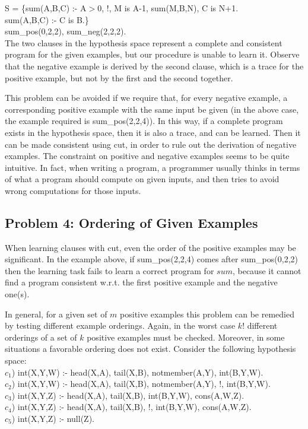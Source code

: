 \noindent
S = \{sum(A,B,C) :- A$>$0, !, M is A-1, sum(M,B,N), C is N+1.\\
\hspace*{0.4in}sum(A,B,C) :- C is B.\}\\
sum\_pos(0,2,2), sum\_neg(2,2,2).\\
 
\noindent
The two clauses in the hypothesis space
represent a complete and consistent program for
the given examples, but our procedure
is unable to learn it. Observe that the
negative example is derived by the second clause,
which is a trace for the positive example, but not by
the first and the second together. 
 
This problem can be avoided if we require
that, for every negative example,
a corresponding positive example with the same input be given
(in the above case, the example required is sum\_pos(2,2,4)).
In this way, if a complete program exists in the hypothesis space, 
then it is also a trace, and can be learned. Then it
can be made consistent using cut,  in order to rule out the derivation
of negative examples. 
The constraint on positive and negative examples seems to be quite 
intuitive. In fact,  when writing a program,
a programmer usually thinks in terms of what a program
should compute on given inputs, 
and then tries to avoid wrong computations for those inputs. 
 
\subsection{Problem 4: Ordering of Given Examples} 
When learning clauses with cut, even 
the order of the positive examples may be significant. In the
example above, if sum\_pos(2,2,4) comes after sum\_pos(0,2,2) then
the learning task
fails to learn a correct program for $sum$, because it cannot find a
program consistent w.r.t. the first positive example and the negative one(s).
 
In general, for a given set of $m$ positive examples
this problem can be remedied by testing different example orderings.
Again, in the worst case $k$! different orderings of a set 
of $k$ positive examples must be checked. Moreover, 
in some situations a favorable ordering does not exist. Consider
the following hypothesis space:\\
 
\noindent
$c_1$) int(X,Y,W) :- head(X,A), tail(X,B), notmember(A,Y), int(B,Y,W).\\
$c_2$) int(X,Y,W) :- head(X,A), tail(X,B), notmember(A,Y), !, int(B,Y,W).\\
$c_3$) int(X,Y,Z) :- head(X,A), tail(X,B), int(B,Y,W), cons(A,W,Z).\\
$c_4$) int(X,Y,Z) :- head(X,A), tail(X,B), !, int(B,Y,W), cons(A,W,Z).\\
$c_5$) int(X,Y,Z) :- null(Z).\\
 
